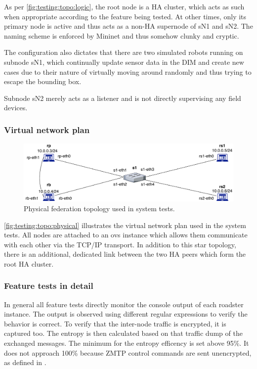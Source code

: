 As per \autoref{fig:testing:topo:logic}, the root node is a HA cluster, which
acts as such when appropriate according to
the feature being tested. At other times, only its primary node is active and
thus acts as a non-HA supernode of sN1 and sN2. The naming scheme is enforced
by Mininet and thus somehow clunky and cryptic.

The configuration also dictates that there are two simulated robots running on
subnode sN1, which continually update sensor data in the DIM and create new
cases due to their nature of virtually moving around randomly and thus trying
to escape the bounding box.

Subnode sN2 merely acts as a listener and is not directly supervising any field
devices.

\subsubsection{Virtual network plan}
\begin{figure}[]
	\center
	\includegraphics[width=\textwidth]{img/physical_network_mininet.pdf}
	\caption{Physical federation topology used in system tests.}
	\label{fig:testing:topo:physical}
\end{figure}

\autoref{fig:testing:topo:physical} illustrates the virtual network plan used in the system tests.
All nodes are attached to an \gls{ovs} instance which allows them communicate with each
other via the TCP/IP transport. In addition to this star topology, there is an
additional, dedicated link between the two HA peers which form the root HA
cluster.

\subsubsection{Feature tests in detail}
In general all feature tests directly monitor the console output of each roadster instance.
The output is observed using different regular expressions to verify the behavior is correct.
To verify that the inter-node traffic is encrypted, it is captured too. The entropy is then calculated
based on that traffic dump of the exchanged messages. The minimum for the entropy efficency is set
above 95\%. It does not approach 100\% because \gls{ZMTP} control
commands are sent unencrypted, as defined in \cite[High-level
Grammar]{zmq:curvezmq}.

